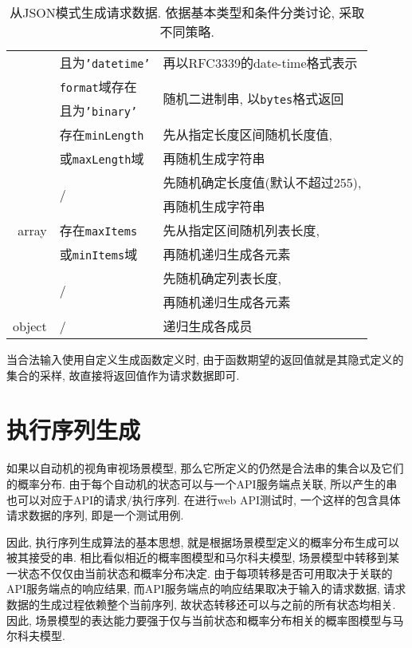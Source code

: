 \begin{table}[!htb]
\begin{tabular}{rll}
                & 且为\texttt{'datetime'} & 再以RFC3339的date-time格式表示 \\
                \cline{2-3}
                & \texttt{format}域存在 & \multirow{2}{*}{随机二进制串, 以\texttt{bytes}格式返回} \\
                & 且为\texttt{'binary'} &  \\
                \cline{2-3}
                & 存在\texttt{minLength} & 先从指定长度区间随机长度值, \\
                & 或\texttt{maxLength}域 & 再随机生成字符串 \\
                \cline{2-3}
                & \multirow{2}{*}{/} & 先随机确定长度值(默认不超过255),\\
                & & 再随机生成字符串 \\
                \hline
                array & 存在\texttt{maxItems} & 先从指定区间随机列表长度,\\
                & 或\texttt{minItems}域 & 再随机递归生成各元素 \\
                \cline{2-3}
                & \multirow{2}{*}{/} & 先随机确定列表长度,\\
                & & 再随机递归生成各元素 \\
                \hline
                object & / & 递归生成各成员 \\
                \bottomrule
            \end{tabular}
            \caption{从JSON模式生成请求数据. 依据基本类型和条件分类讨论, 采取不同策略.}
            \label{tab:schemagen}
        \end{table}
        
        当合法输入使用自定义生成函数定义时, 由于函数期望的返回值就是其隐式定义的集合的采样, 故直接将返回值作为请求数据即可.
        
    \section{执行序列生成}
        如果以自动机的视角审视场景模型, 那么它所定义的仍然是合法串的集合以及它们的概率分布. 由于每个自动机的状态可以与一个API服务端点关联, 所以产生的串也可以对应于API的请求/执行序列. 在进行web API测试时, 一个这样的包含具体请求数据的序列, 即是一个测试用例.
        
        因此, 执行序列生成算法的基本思想, 就是根据场景模型定义的概率分布生成可以被其接受的串. 相比看似相近的概率图模型和马尔科夫模型, 场景模型中转移到某一状态不仅仅由当前状态和概率分布决定. 由于每项转移是否可用取决于关联的API服务端点的响应结果, 而API服务端点的响应结果取决于输入的请求数据, 请求数据的生成过程依赖整个当前序列, 故状态转移还可以与之前的所有状态均相关. 因此, 场景模型的表达能力要强于仅与当前状态和概率分布相关的概率图模型与马尔科夫模型.
        
